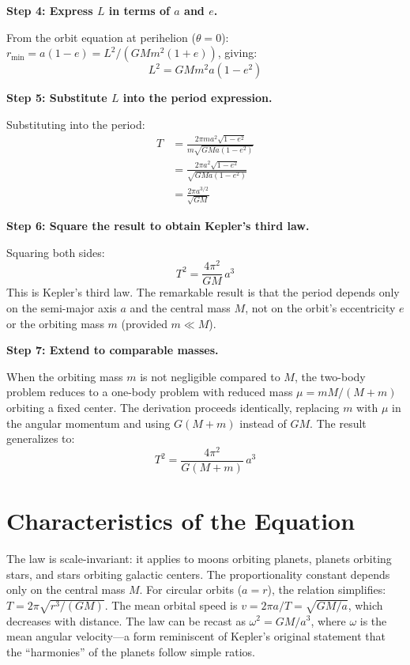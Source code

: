 \textbf{Step 4: Express $L$ in terms of $a$ and $e$.}

From the orbit equation at perihelion ($\theta = 0$): $r_{\text{min}} = a(1-e) = L^2/(GMm^2(1+e))$, giving:
\begin{equation}
L^2 = GMm^2 a(1-e^2)
\end{equation}

\textbf{Step 5: Substitute $L$ into the period expression.}

Substituting into the period:
\begin{align}
T &= \frac{2\pi m a^2\sqrt{1-e^2}}{m\sqrt{GMa(1-e^2)}} \nonumber\\
&= \frac{2\pi a^2\sqrt{1-e^2}}{\sqrt{GMa(1-e^2)}} \nonumber\\
&= \frac{2\pi a^{3/2}}{\sqrt{GM}}
\end{align}

\textbf{Step 6: Square the result to obtain Kepler's third law.}

Squaring both sides:
\begin{equation}
T^2 = \frac{4\pi^2}{GM}\,a^3
\end{equation}
This is Kepler's third law. The remarkable result is that the period depends only on the semi-major axis $a$ and the central mass $M$, not on the orbit's eccentricity $e$ or the orbiting mass $m$ (provided $m \ll M$).

\textbf{Step 7: Extend to comparable masses.}

When the orbiting mass $m$ is not negligible compared to $M$, the two-body problem reduces to a one-body problem with reduced mass $\mu = mM/(M+m)$ orbiting a fixed center. The derivation proceeds identically, replacing $m$ with $\mu$ in the angular momentum and using $G(M+m)$ instead of $GM$. The result generalizes to:
\begin{equation}
T^2 = \frac{4\pi^2}{G(M+m)}\,a^3
\end{equation}

\section*{Characteristics of the Equation}

The law is scale-invariant: it applies to moons orbiting planets, planets orbiting stars, and stars orbiting galactic centers. The proportionality constant depends only on the central mass $M$. For circular orbits ($a = r$), the relation simplifies: $T = 2\pi\sqrt{r^3/(GM)}$. The mean orbital speed is $v = 2\pi a/T = \sqrt{GM/a}$, which decreases with distance. The law can be recast as $\omega^2 = GM/a^3$, where $\omega$ is the mean angular velocity---a form reminiscent of Kepler's original statement that the ``harmonies'' of the planets follow simple ratios.
